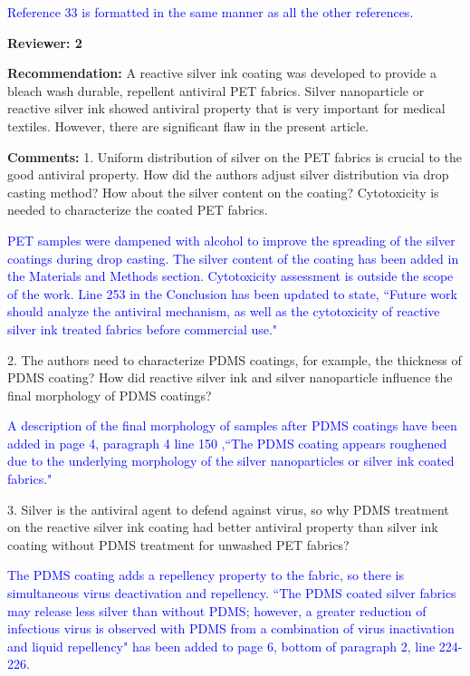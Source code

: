 \documentclass[12pt]{letter}
\newcommand{\blue}[1]{\textcolor{blue}{#1}} %
\begin{document}
\blue{Reference 33 is formatted in the same manner as all the other references.}

\newpage
\textbf{Reviewer: 2}

\textbf{Recommendation:} A reactive silver ink coating was developed to provide a bleach wash durable, repellent antiviral PET fabrics. Silver nanoparticle or reactive silver ink showed antiviral property that is very important for medical textiles. However, there are significant flaw in the present article.

\textbf{Comments:} 
1. Uniform distribution of silver on the PET fabrics is crucial to the good antiviral property. How did the authors adjust silver distribution via drop casting method? How about the silver content on the coating? Cytotoxicity is needed to characterize the coated PET fabrics.

\blue{PET samples were dampened with alcohol to improve the spreading of the silver coatings during drop casting. The silver content of the coating has been added in the Materials and Methods section. Cytotoxicity assessment is outside the scope of the work.  Line 253 in the Conclusion has been updated to state, ``Future work should analyze the antiviral mechanism, as well as the cytotoxicity of reactive silver ink treated fabrics before
commercial use."}

2. The authors need to characterize PDMS coatings, for example, the thickness of PDMS coating? How did reactive silver ink and silver nanoparticle influence the final morphology of PDMS coatings?

\blue{A description of the final morphology of samples after PDMS coatings have been added in page 4, paragraph 4 line 150 ,``The PDMS
coating appears roughened due to the underlying morphology of the silver nanoparticles
or silver ink coated fabrics." }

3. Silver is the antiviral agent to defend against virus, so why PDMS treatment on the reactive silver ink coating had better antiviral property than silver ink coating without PDMS treatment for unwashed PET fabrics?

\blue{The PDMS coating adds a repellency property to the fabric, so there is simultaneous virus deactivation and repellency. ``The PDMS coated silver 
fabrics may release less silver than without PDMS; however, a greater reduction of 
infectious virus is observed with PDMS from a combination of virus inactivation and 
liquid repellency" has been added to page 6, bottom of paragraph 2, line 224-226.}
\end{document}
